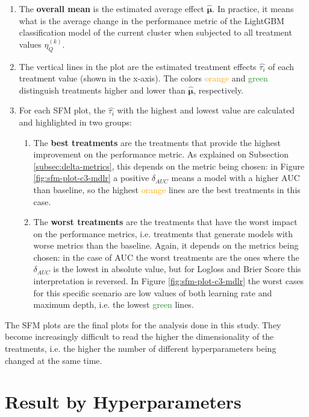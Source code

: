 \begin{enumerate}
    \item The \textbf{overall mean} is the estimated average effect $\hat{\bm{\mu}}$. In practice, it means what is the average change in the performance metric of the LightGBM classification model of the current cluster when subjected to all treatment values  $\eta^{(k)}_Q$.
    \item The vertical lines in the plot are the estimated treatment effects $\hat{\tau_i}$ of each treatment value (shown in the x-axis). The colors \textcolor{orange}{orange} and \textcolor{ForestGreen}{green} distinguish treatments higher and lower than  $\hat{\bm{\mu}}$, respectively.
    \item For each SFM plot, the $\hat{\tau_i}$ with the highest and lowest value are calculated and highlighted in two groups:
    \begin{enumerate}
        \item The \textbf{best treatments} are the treatments that provide the highest improvement on the performance metric. As explained on Subsection \ref{subsec:delta-metrics}, this depends on the metric being chosen: in Figure \ref{fig:sfm-plot-c3-mdlr} a positive $\delta_{AUC}$ means a model with a higher AUC than baseline, so the highest \textcolor{orange}{orange} lines are the best treatments in this case.
        \item The \textbf{worst treatments} are the treatments that have the worst impact on the performance metrics, i.e. treatments that generate models with worse metrics than the baseline. Again, it depends on the metrics being chosen: in the case of AUC the worst treatments are the ones where the $\delta_{AUC}$ is the lowest in absolute value, but for Logloss and Brier Score this interpretation is reversed. In Figure \ref{fig:sfm-plot-c3-mdlr} the worst cases for this specific scenario are low values of both learning rate and maximum depth, i.e. the lowest \textcolor{ForestGreen}{green} lines.
    \end{enumerate}
\end{enumerate}

The SFM plots are the final plots for the analysis done in this study. They become increasingly difficult to read the higher the dimensionality of the treatments, i.e. the higher the number of different hyperparameters being changed at the same time.

\section{Result by Hyperparameters}

